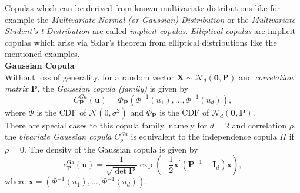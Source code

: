 
Copulas which can be derived from known multivariate distributions like for example the \textit{Multivariate Normal (or Gaussian) Distribution} or the \textit{Multivariate Student's t-Distribution} are called \textit{implicit copulas}. \textit{Elliptical copulas} are implicit copulas which arise via Sklar's theorem from elliptical distributions like the mentioned examples.\\

\textbf{Gaussian Copula}\\
Without loss of generality, for a random vector $\bm{X} \sim {\mathcal{N}_{d}(\bm{0}, \mathbf{P})} $ and \textit{correlation matrix} $\bm{P}$,
the \textit{Gaussian copula (family)} is given by
\begin{equation}
C_{\mathbf{P}}^{G a}(\mathbf{u})=\Phi_{\mathbf{P}}\left(\Phi^{-1}\left(u_{1}\right), \ldots, \Phi^{-1}\left(u_{d}\right)\right),
\end{equation}
where $\Phi$ is the \ac{CDF} of $\mathcal{N}(0, \sigma^{2})$ and 
$\Phi_{\bm{P}}$ is the \ac{CDF} of $\mathcal{N}_{d}(\bm{0}, \mathbf{P})$.\\
There are special cases to this copula family, namely for $d=2$ and correlation $\rho$, the \textit{bivariate Gaussian copula} $C_{\rho}^{G a}$ is equivalent to the independence copula $\Pi$ if $\rho = 0$.
The density of the Gaussian copula is given by
\begin{equation}
c_{\bm{P}}^{\mathrm{Ga}}(\boldsymbol{u})=\frac{1}{\sqrt{\operatorname{det} \bm{P}}} \exp \left(-\frac{1}{2} \boldsymbol{x}^{\prime}\left(\bm{P}^{-1}-\bm{I}_{d}\right) \boldsymbol{x}\right),
\end{equation}
where $\bm{x} = \left(\Phi^{-1}\left(u_{1}\right), \ldots, \Phi^{-1}\left(u_{d}\right)\right)$.
\\

